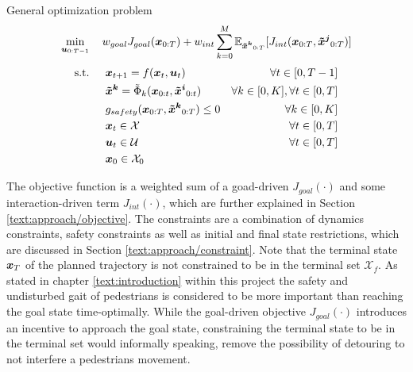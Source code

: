 \begin{problem} General \project optimization problem
\begin{equation}
\min_{\u_{0:T-1}} \quad w_{goal} J_{goal}(\x_{0:T}) + w_{int} \sum_{k=0}^M \mathbb{E}_{\xped[k]_{0:T}}[J_{int}(\x_{0:T}, \xped[j]_{0:T})]
\end{equation}
\begin{align}
\textrm{s.t. } \quad & \x_{t+1} = f(\x_t, \u_t) & \forall t \in [0, T - 1] \\
& \xped[k] = \tilde{\Phi}_k(\x_{0:t}, \xped[i]_{0:t}) & \forall k \in [0, K], \forall t \in [0, T]\\
& g_{safety}(\x_{0:T}, \xped[k]_{0:T}) \leq 0 & \forall k \in [0, K] \\
& \x_t \in \mathcal{X} & \forall t \in [0, T]\\
& \u_t \in \mathcal{U} & \forall t \in [0, T]\\
& \x_0 \in \mathcal{X}_0
\end{align} 
\label{eq:formulation}
\end{problem}

The objective function is a weighted sum of a goad-driven $J_{goal}(\cdot)$ and some interaction-driven term $J_{int}(\cdot)$, which are further explained in Section \ref{text:approach/objective}. The constraints are a combination of dynamics constraints, safety constraints as well as initial and final state restrictions, which are discussed in Section \ref{text:approach/constraint}. Note that the terminal state $\boldsymbol{x}_T$ of the planned trajectory is not constrained to be in the terminal set $\mathcal{X}_f$. As stated in chapter \ref{text:introduction} within this project the safety and undisturbed gait of pedestrians is considered to be more important than reaching the goal state time-optimally. While the goal-driven objective $J_{goal}(\cdot)$ introduces an incentive to approach the goal state, constraining the terminal state to be in the terminal set would informally speaking, remove the possibility of detouring to not interfere a pedestrians movement. 


